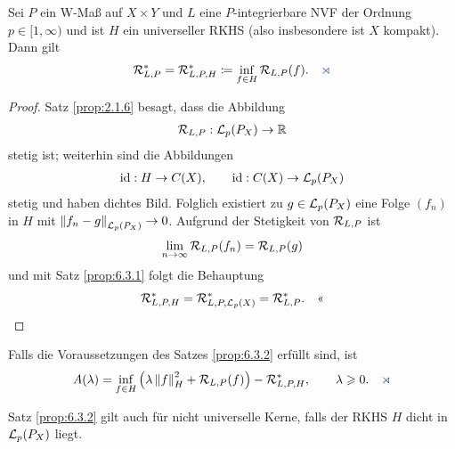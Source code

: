 \begin{prop}
\label{prop:6.3.2}
Sei $P$ ein W-Maß auf $X\times Y$ und $L$ eine $P$-integrierbare NVF der Ordnung
$p\in [1,\infty)$ und ist $H$ ein universeller RKHS (also insbesondere
ist $X$ kompakt). Dann gilt
\begin{align*}
\RR_{L,P}^* = \RR_{L,P,H}^* \defl \inf_{f\in H} \RR_{L,P}(f).\fishhere
\end{align*}
\end{prop}
\begin{proof}
Satz \ref{prop:2.1.6} besagt, dass die Abbildung
\begin{align*}
\mathcal{R}_{L,P} : \mathcal{L}_p(P_X) \to \mathbb{R}
\end{align*} 
stetig ist; weiterhin sind die Abbildungen
\begin{align*}
\operatorname{id} : H\to C(X),\qquad \operatorname{id} : C(X)\to \mathcal{L}_p(P_X)
\end{align*}
stetig und haben dichtes Bild. Folglich existiert zu $g\in\mathcal{L}_p(P_X)$ eine Folge
$(f_n)$ in $H$ mit $\left\|f_n-g\right\|_{\mathcal{L}_p(P_X)} \to 0$.  Aufgrund der Stetigkeit
von $\mathcal{R}_{L,P}$ ist
\begin{align*}
\lim\limits_{n\to\infty} \mathcal{R}_{L,P}(f_n) = \mathcal{R}_{L,P}(g)
\end{align*}
und mit Satz \ref{prop:6.3.1} folgt die Behauptung
\begin{align*}
\mathcal{R}_{L,P,H}^* = \mathcal{R}_{L,P,\mathcal{L}_p(X)}^* = \mathcal{R}_{L,P}^*.\quad\text{<<}
\end{align*}
\end{proof}

\begin{cor*}
Falls die Voraussetzungen des Satzes \ref{prop:6.3.2} erfüllt sind, ist
\begin{align*}
A(\lambda) = \inf_{f\in H} \left(\lambda \norm{f}_H^2 + \RR_{L,P}(f)\right) -
\RR_{L,P,H}^*,\qquad \lambda \ge 0.\fishhere
\end{align*}
\end{cor*}

\begin{bem*}
Satz \ref{prop:6.3.2} gilt auch für nicht universelle Kerne, falls der RKHS $H$
dicht in $\mathcal{L}_p(P_X)$ liegt.\maphere
\end{bem*}

